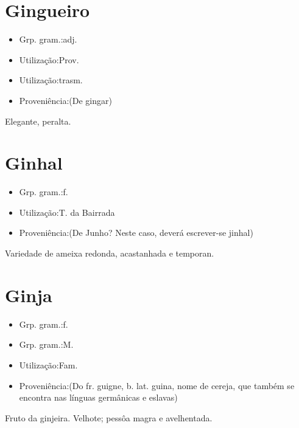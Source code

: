 \section{Gingueiro}
\begin{itemize}
\item {Grp. gram.:adj.}
\end{itemize}
\begin{itemize}
\item {Utilização:Prov.}
\end{itemize}
\begin{itemize}
\item {Utilização:trasm.}
\end{itemize}
\begin{itemize}
\item {Proveniência:(De \textunderscore gingar\textunderscore )}
\end{itemize}
Elegante, peralta.
\section{Ginhal}
\begin{itemize}
\item {Grp. gram.:f.}
\end{itemize}
\begin{itemize}
\item {Utilização:T. da Bairrada}
\end{itemize}
\begin{itemize}
\item {Proveniência:(De \textunderscore Junho\textunderscore ? Neste caso, deverá escrever-se \textunderscore jinhal\textunderscore )}
\end{itemize}
Variedade de ameixa redonda, acastanhada e temporan.
\section{Ginja}
\begin{itemize}
\item {Grp. gram.:f.}
\end{itemize}
\begin{itemize}
\item {Grp. gram.:M.}
\end{itemize}
\begin{itemize}
\item {Utilização:Fam.}
\end{itemize}
\begin{itemize}
\item {Proveniência:(Do fr. \textunderscore guigne\textunderscore , b. lat. \textunderscore guina\textunderscore , nome de cereja, que também se encontra nas línguas germânicas e eslavas)}
\end{itemize}
Fruto da ginjeira.
Velhote; pessôa magra e avelhentada.
